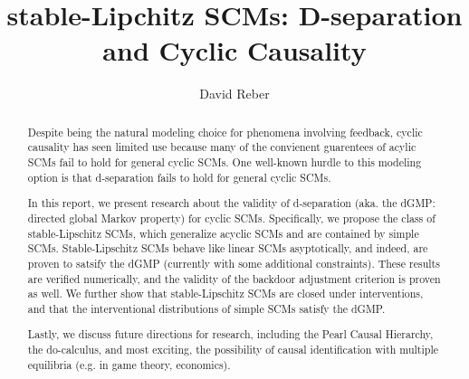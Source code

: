 \documentclass[letterpaper,10pt]{article}
\begin{document}
\title{stable-Lipchitz SCMs: D-separation and Cyclic Causality}

\author{David Reber}
\address{Columbia University}


\begin{abstract}
Despite being the natural modeling choice for phenomena involving feedback, cyclic causality has seen limited use because many of the convienent guarentees of acylic SCMs fail to hold for general cyclic SCMs. One well-known hurdle to this modeling option is that d-separation fails to hold for general cyclic SCMs.

In this report, we present research about the validity of d-separation (aka. the dGMP: directed global Markov property) for cyclic SCMs. Specifically, we propose the class of stable-Lipschitz SCMs, which generalize acyclic SCMs and are contained by simple SCMs. Stable-Lipschitz SCMs behave like linear SCMs asyptotically, and indeed, are proven to satsify the dGMP (currently with some additional constraints).
These results are verified numerically, and the validity of the backdoor adjustment criterion is proven as well. We further show that stable-Lipschitz SCMs are closed under interventions, and that the interventional distributions of simple SCMs satisfy the dGMP.

Lastly, we discuss future directions for research, including the Pearl Causal Hierarchy, the do-calculus, and most exciting, the possibility of causal identification with multiple equilibria (e.g. in game theory, economics).
\end{abstract}





\end{document}
